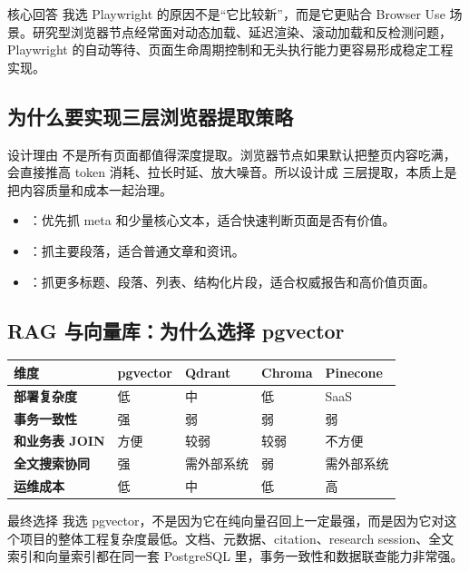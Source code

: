 \documentclass[12pt]{article}
\begin{document}
\begin{qaBox}{核心回答}
我选 Playwright 的原因不是“它比较新”，而是它更贴合 Browser Use 场景。研究型浏览器节点经常面对动态加载、延迟渲染、滚动加载和反检测问题，Playwright 的自动等待、页面生命周期控制和无头执行能力更容易形成稳定工程实现。
\end{qaBox}

\subsection{为什么要实现三层浏览器提取策略}
\begin{qaBox}{设计理由}
不是所有页面都值得深度提取。浏览器节点如果默认把整页内容吃满，会直接推高 token 消耗、拉长时延、放大噪音。所以设计成  三层提取，本质上是把内容质量和成本一起治理。
\end{qaBox}

\begin{itemize}[leftmargin=2em]
  \item {}：优先抓 meta 和少量核心文本，适合快速判断页面是否有价值。
  \item {}：抓主要段落，适合普通文章和资讯。
  \item {}：抓更多标题、段落、列表、结构化片段，适合权威报告和高价值页面。
\end{itemize}

\subsection{RAG 与向量库：为什么选择 pgvector}
\begin{center}
\small
\begin{tabularx}{\textwidth}{>{\bfseries}lXXXX}
\toprule
维度 & pgvector & Qdrant & Chroma & Pinecone \\
\midrule
部署复杂度 & 低 & 中 & 低 & SaaS \\
事务一致性 & 强 & 弱 & 弱 & 弱 \\
和业务表 JOIN & 方便 & 较弱 & 较弱 & 不方便 \\
全文搜索协同 & 强 & 需外部系统 & 弱 & 需外部系统 \\
运维成本 & 低 & 中 & 低 & 高 \\
\bottomrule
\end{tabularx}
\end{center}

\begin{qaBox}{最终选择}
我选 pgvector，不是因为它在纯向量召回上一定最强，而是因为它对这个项目的整体工程复杂度最低。文档、元数据、citation、research session、全文索引和向量索引都在同一套 PostgreSQL 里，事务一致性和数据联查能力非常强。
\end{qaBox}
\end{document}

